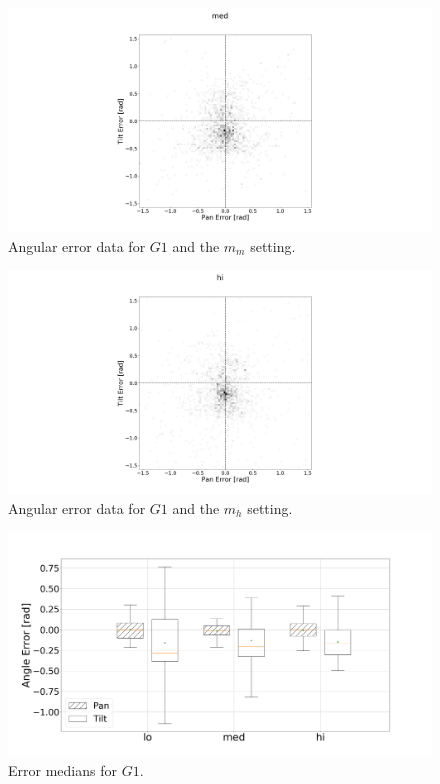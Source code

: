 \documentclass[sigconf, screen=true, anonymous=true]{acmart}
\begin{document}
\begin{figure}
  \centering
  \includegraphics[clip, trim=450 0 450 110, width=0.8\columnwidth]{figures/err_med.png}
  \caption{Angular error data for $G1$ and the $m_m$ setting. }\label{fig:err-results-med}
\end{figure}

\begin{figure}
  \centering
  \includegraphics[clip, trim=450 0 450 110, width=0.8\columnwidth]{figures/err_hi.png}
  \caption{Angular error data for $G1$ and the $m_h$ setting. }\label{fig:err-results-hi}
\end{figure}

\begin{figure}
  \centering
  \includegraphics[clip, trim=20 -70 100 100, width=0.8\columnwidth]{figures/err_boxplot_medians.png}
  \caption{Error medians for $G1$.}\label{fig:err-boxplot-median}
\end{figure}
\end{document}
